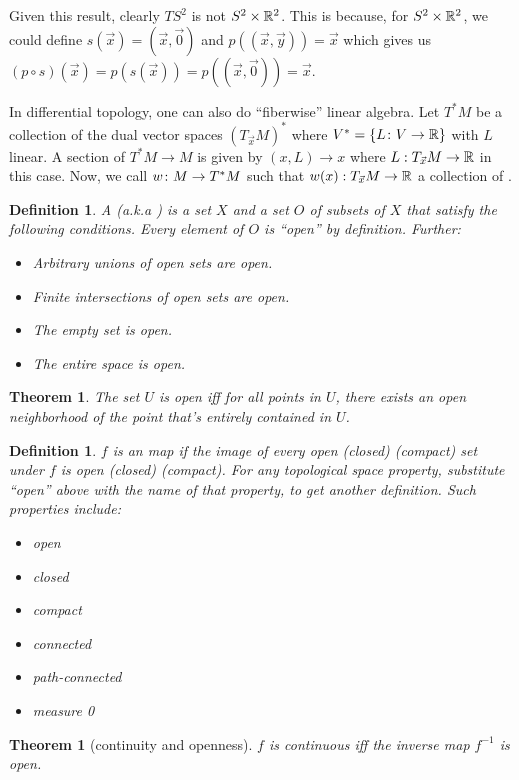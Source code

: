 \documentclass[11pt]{amsbook}
\theoremstyle{mystyle} %
\newtheorem{thrm}[thm]{Theorem}
\newtheorem{defi}[thm]{Definition}
\numberwithin{thm}{section}
\begin{document}
Given this result, clearly $TS^2$ is not $S^2 \times {\mathbb R}^2$. This is because,
for $S^2 \times {\mathbb R}^2$, we could define $s(\vec{x}) = (\vec{x}, \vec{0})$ and
$p( (\vec{x},\vec{y}) ) = \vec{x}$ which gives us $(p \circ s)(\vec{x}) =
p(s(\vec{x})) = p( (\vec{x}, \vec{0}) )= \vec{x}$.


In differential topology, one can also do ``fiberwise'' linear algebra. Let
$T^*M$ be a collection of the dual vector spaces $(T_{\vec{x}}M)^*$ where $V^* =
\{L\colon V \to {\mathbb R}\}$ with $L$ linear. A section of $T^*M \to M$ is given by $(x,L)
\to x$ where $L: T_{\vec{x}}M \to {\mathbb R}$ in this case. Now, we call $w\colon M \to
T^*M$ such that $w(x): T_{\vec{x}}M \to {\mathbb R}$ a collection of .


\begin{defi}
	A  (a.k.a ) is a set $X$ and a set $O$ of subsets of $X$ that satisfy the following conditions.  Every element of $O$ is ``open'' by definition.  Further:
	\begin{itemize}
		\item Arbitrary unions of open sets are open.
		\item Finite intersections of open sets are open.
		\item The empty set is open.
		\item The entire space is open.
	\end{itemize}
\end{defi}
\begin{thrm}
	The set $U$ is open iff for all points in $U$, there exists an open neighborhood of the point that's entirely contained in $U$.
\end{thrm}
\begin{defi}
	$f$ is an  map if the image of every open (closed) (compact) set under $f$ is open (closed) (compact).
	For any topological space property, substitute ``open'' above with the name of that property, to get another definition.  Such properties include:
	\begin{itemize}
		\item open
		\item closed
		\item compact
		\item connected
		\item path-connected
		\item measure 0
	\end{itemize}
\end{defi}
\begin{thrm}[continuity and openness]
	$f$ is continuous iff the inverse map $f^{-1}$ is open.
\end{thrm}
\end{document}
